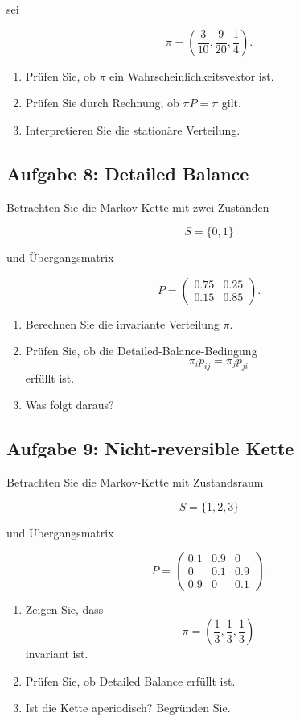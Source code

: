 \documentclass[11pt,a4paper]{article}
\begin{document}
sei

\[
\pi =
\left(
\frac{3}{10},
\frac{9}{20},
\frac{1}{4}
\right).
\]

\begin{enumerate}
    \item Prüfen Sie, ob $\pi$ ein Wahrscheinlichkeitsvektor ist.
    \item Prüfen Sie durch Rechnung, ob $\pi P = \pi$ gilt.
    \item Interpretieren Sie die stationäre Verteilung.
\end{enumerate}

\subsection*{Aufgabe 8: Detailed Balance}

Betrachten Sie die Markov-Kette mit zwei Zuständen

\[
S = \{0,1\}
\]

und Übergangsmatrix

\[
P =
\begin{pmatrix}
0.75 & 0.25 \\
0.15 & 0.85
\end{pmatrix}.
\]

\begin{enumerate}
    \item Berechnen Sie die invariante Verteilung $\pi$.
    \item Prüfen Sie, ob die Detailed-Balance-Bedingung
    \[
    \pi_i p_{ij} = \pi_j p_{ji}
    \]
    erfüllt ist.
    \item Was folgt daraus?
\end{enumerate}

\subsection*{Aufgabe 9: Nicht-reversible Kette}

Betrachten Sie die Markov-Kette mit Zustandsraum

\[
S=\{1,2,3\}
\]

und Übergangsmatrix

\[
P =
\begin{pmatrix}
0.1 & 0.9 & 0 \\
0 & 0.1 & 0.9 \\
0.9 & 0 & 0.1
\end{pmatrix}.
\]

\begin{enumerate}
    \item Zeigen Sie, dass
    \[
    \pi=\left(\frac13,\frac13,\frac13\right)
    \]
    invariant ist.
    \item Prüfen Sie, ob Detailed Balance erfüllt ist.
    \item Ist die Kette aperiodisch? Begründen Sie.
\end{enumerate}
\end{document}
